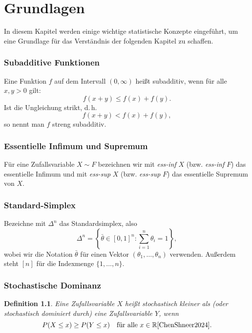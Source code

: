 \documentclass[
12pt,
fancyheadings, %
%
a4paper, 
%
]{tuhhreprt}
\newtheorem{definition}{Definition}[chapter]
\begin{document}
\chapter{Grundlagen}

\makeatletter
\renewcommand{\thesubsection}{\thechapter.\arabic{subsection}}
\makeatother
In diesem Kapitel werden einige wichtige statistische Konzepte eingeführt, um eine Grundlage für das Verständnis der folgenden Kapitel zu schaffen.

\subsection{Subadditive Funktionen}

Eine Funktion \( f \) auf dem Intervall \( (0, \infty) \) heißt subadditiv, wenn für alle \( x, y > 0 \) gilt:
\[
f(x + y) \leq f(x) + f(y).
\]
Ist die Ungleichung strikt, d.\,h.
\[
f(x + y) < f(x) + f(y),
\]
so nennt man \( f \) streng subadditiv\cite{ChenShneer2024}.
\subsection{Essentielle Infimum und Supremum}

Für eine Zufallsvariable \( X \sim F \) bezeichnen wir mit \textit{ess-inf} \( X \) (bzw. \textit{ess-inf} \( F \)) das essentielle Infimum und mit \textit{ess-sup} \( X \) (bzw. \textit{ess-sup} \( F \)) das essentielle Supremum von \( X \)\cite{ChenShneer2024}.

\subsection{Standard-Simplex}
Bezeichne mit \(\Delta^n\) das Standardsimplex, also
\[
\Delta^n = \left\{ \bar{\theta} \in [0, 1]^n : \sum_{i=1}^n \theta_i = 1 \right\},
\]
wobei wir die Notation \(\bar{\theta}\) für einen Vektor \((\theta_1, \ldots, \theta_n)\) verwenden. Außerdem steht \([n]\) für die Indexmenge \(\{1, \ldots, n\}\)\cite{ChenShneer2024}.
\subsection{Stochastische Dominanz}
\label{sec:stoch_dominanz}
\begin{definition}
Eine Zufallsvariable \( X \) heißt stochastisch kleiner als (oder stochastisch dominiert durch) eine Zufallsvariable \( Y \), wenn
\[
P(X \leq x) \geq P(Y \leq x) \quad \text{für alle } x \in \mathbb{R}\cite{ChenShneer2024}.
\]
\end{definition}
\end{document}
